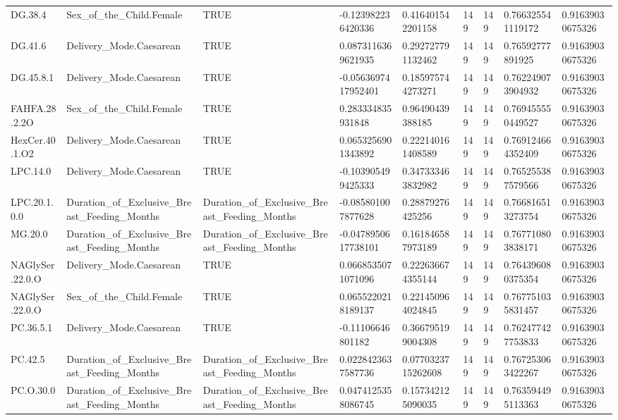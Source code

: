 \begin{longtable}{lllllllll}
DG.38.4 & Sex\_of\_the\_Child.Female & TRUE & -0.123982236420336 & 0.416401542201158 & 149 & 149 & 0.766325541119172 & 0.91639030675326 \\
DG.41.6 & Delivery\_Mode.Caesarean & TRUE & 0.0873116369621935 & 0.292727791132462 & 149 & 149 & 0.76592777891925 & 0.91639030675326 \\
DG.45.8.1 & Delivery\_Mode.Caesarean & TRUE & -0.0563697417952401 & 0.185975744273271 & 149 & 149 & 0.762249073904932 & 0.91639030675326 \\
FAHFA.28.2.2O & Sex\_of\_the\_Child.Female & TRUE & 0.283334835931848 & 0.96490439388185 & 149 & 149 & 0.769455550449527 & 0.91639030675326 \\
HexCer.40.1.O2 & Delivery\_Mode.Caesarean & TRUE & 0.0653256901343892 & 0.222140161408589 & 149 & 149 & 0.769124664352409 & 0.91639030675326 \\
LPC.14.0 & Delivery\_Mode.Caesarean & TRUE & -0.103905499425333 & 0.347333463832982 & 149 & 149 & 0.765255387579566 & 0.91639030675326 \\
LPC.20.1.0.0 & Duration\_of\_Exclusive\_Breast\_Feeding\_Months & Duration\_of\_Exclusive\_Breast\_Feeding\_Months & -0.085801007877628 & 0.28879276425256 & 149 & 149 & 0.766816513273754 & 0.91639030675326 \\
MG.20.0 & Duration\_of\_Exclusive\_Breast\_Feeding\_Months & Duration\_of\_Exclusive\_Breast\_Feeding\_Months & -0.0478950617738101 & 0.161846587973189 & 149 & 149 & 0.767710803838171 & 0.91639030675326 \\
NAGlySer.22.0.O & Delivery\_Mode.Caesarean & TRUE & 0.0668535071071096 & 0.222636674355144 & 149 & 149 & 0.764396080375354 & 0.91639030675326 \\
NAGlySer.22.0.O & Sex\_of\_the\_Child.Female & TRUE & 0.0655220218189137 & 0.221450964024845 & 149 & 149 & 0.767751035831457 & 0.91639030675326 \\
PC.36.5.1 & Delivery\_Mode.Caesarean & TRUE & -0.11106646801182 & 0.366795199004308 & 149 & 149 & 0.762477427753833 & 0.91639030675326 \\
PC.42.5 & Duration\_of\_Exclusive\_Breast\_Feeding\_Months & Duration\_of\_Exclusive\_Breast\_Feeding\_Months & 0.0228423637587736 & 0.0770323715262608 & 149 & 149 & 0.767253063422267 & 0.91639030675326 \\
PC.O.30.0 & Duration\_of\_Exclusive\_Breast\_Feeding\_Months & Duration\_of\_Exclusive\_Breast\_Feeding\_Months & 0.0474125358086745 & 0.157342125090035 & 149 & 149 & 0.763594495113363 & 0.91639030675326 \\

\end{longtable}
